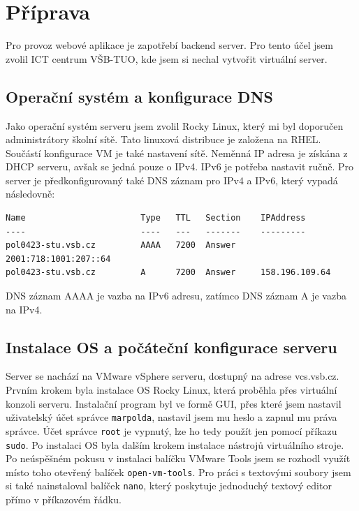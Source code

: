 \chapter{Příprava}
Pro provoz webové aplikace je zapotřebí backend server.
Pro tento účel jsem zvolil ICT centrum VŠB-TUO, kde jsem si nechal
vytvořit virtuální server.

\section{Operační systém a konfigurace DNS}
Jako operační systém serveru jsem zvolil Rocky Linux,
který mi byl doporučen administrátory školní sítě. Tato linuxová
distribuce je založena na RHEL. Součástí konfigurace VM je také
nastavení sítě. Neměnná IP adresa je získána z DHCP serveru,
avšak se jedná pouze o IPv4. IPv6 je potřeba nastavit ručně.
Pro server je předkonfigurovaný také DNS záznam pro IPv4 a IPv6,
který vypadá následovně:

\begin{verbatim}
Name                       Type   TTL   Section    IPAddress
----                       ----   ---   -------    ---------
pol0423-stu.vsb.cz         AAAA   7200  Answer     2001:718:1001:207::64
pol0423-stu.vsb.cz         A      7200  Answer     158.196.109.64
\end{verbatim}

DNS záznam AAAA je vazba na IPv6 adresu, zatímco DNS záznam A
je vazba na IPv4.

\section{Instalace OS a počáteční konfigurace serveru}
Server se nachází na VMware vSphere serveru, dostupný
na adrese vcs.vsb.cz. Prvním krokem byla instalace OS Rocky Linux,
která proběhla přes virtuální konzoli serveru. Instalační program
byl ve formě GUI, přes které jsem nastavil uživatelský účet správce
\texttt{marpolda}, nastavil jsem mu heslo a zapnul mu práva správce.
Účet správce \texttt{root} je vypnutý, lze ho tedy použít jen pomocí
příkazu \texttt{sudo}. Po instalaci OS byla dalším krokem instalace
nástrojů virtuálního stroje. Po neúspěšném pokusu v instalaci balíčku
VMware Tools jsem se rozhodl využít místo toho otevřený balíček
\texttt{open-vm-tools}. Pro práci s textovými soubory jsem si
také nainstaloval balíček \texttt{nano}, který poskytuje jednoduchý
textový editor přímo v příkazovém řádku.

